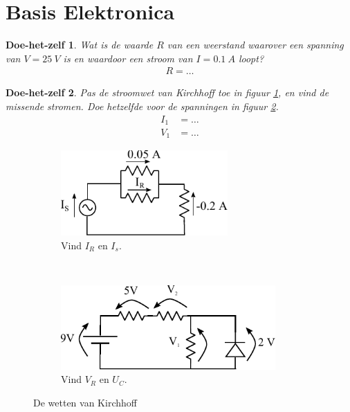 \documentclass{article}
\newtheorem{DIY}{Doe-het-zelf}
\begin{document}
	
	\maketitle

	\tableofcontents
	\clearpage

\section{Basis Elektronica}

			\begin{DIY} Wat is de waarde $R$ van een weerstand waarover een spanning van $V = 25~V$ is en waardoor een stroom van $I = 0.1~A$ loopt?
			\begin{align}
			    R = \ldots
			\end{align}
			\end{DIY}
		\vspace{20ex}

			\begin{DIY} Pas de stroomwet van Kirchhoff toe in figuur \ref{subfig:kcl_oef}, en vind de missende stromen. Doe hetzelfde voor de spanningen in figuur \ref{subfig:kvl_oef}.
			\begin{align*}
			    I_1 &= \ldots \\
			    V_1 &= \ldots 
			\end{align*}
			\end{DIY}

			\begin{figure}[htbp]
				\centering
				\begin{subfigure}[b]{0.45\linewidth}
					\centering
					\includegraphics[width=0.7\textwidth]{kcl_oef.pdf}
					\caption{Vind $I_R$ en $I_s$.}
					\label{subfig:kcl_oef}
				\end{subfigure}
				~
				\begin{subfigure}[b]{0.45\linewidth}
					\centering
					\includegraphics[width=0.9\textwidth]{kvl_oef.pdf}
					\caption{Vind $V_R$ en $U_C$. }
					\label{subfig:kvl_oef}
				\end{subfigure}
			\caption{De wetten van Kirchhoff}
			\label{fig:kirchoff_oef}
			\end{figure}
\vspace{40ex}
\end{document}

